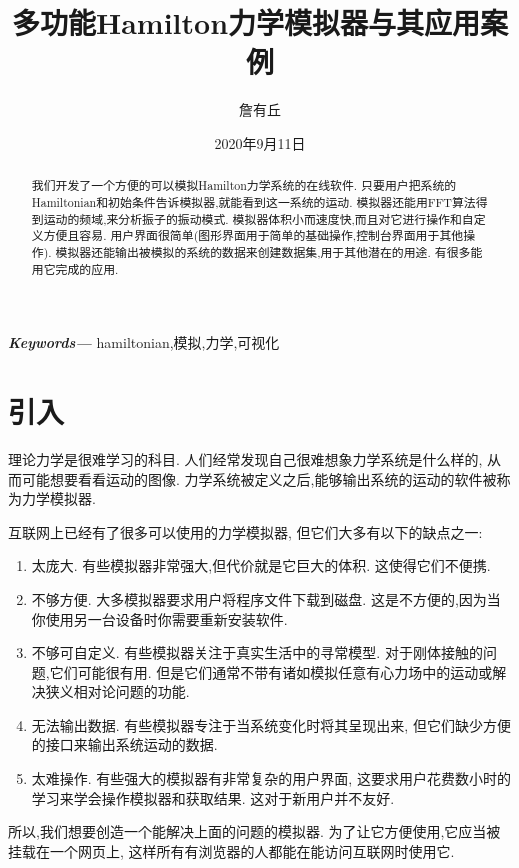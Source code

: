 \documentclass[12pt]{article}
\date{2020年9月11日}
\title{多功能Hamilton力学模拟器与其应用案例}
\author{詹有丘}
\providecommand{\keywords}[1]{\small\textbf{\textit{Keywords---}} #1}
\begin{document}
\maketitle

\begin{abstract}
我们开发了一个方便的可以模拟Hamilton力学系统的在线软件.
只要用户把系统的Hamiltonian和初始条件告诉模拟器,就能看到这一系统的运动.
模拟器还能用FFT算法得到运动的频域,来分析振子的振动模式.
模拟器体积小而速度快,而且对它进行操作和自定义方便且容易.
用户界面很简单(图形界面用于简单的基础操作,控制台界面用于其他操作).
模拟器还能输出被模拟的系统的数据来创建数据集,用于其他潜在的用途.
有很多能用它完成的应用.
\end{abstract}

\keywords{hamiltonian,模拟,力学,可视化}

\tableofcontents

\section{引入}
\label{sec:intro}

理论力学是很难学习的科目.
人们经常发现自己很难想象力学系统是什么样的,
从而可能想要看看运动的图像.
力学系统被定义之后,能够输出系统的运动的软件被称为力学模拟器.

互联网上已经有了很多可以使用的力学模拟器,
但它们大多有以下的缺点之一:
\begin{enumerate}
  \item 太庞大.
  有些模拟器非常强大,但代价就是它巨大的体积.
  这使得它们不便携.

  \item 不够方便.
  大多模拟器要求用户将程序文件下载到磁盘.
  这是不方便的,因为当你使用另一台设备时你需要重新安装软件.

  \item 不够可自定义.
  有些模拟器关注于真实生活中的寻常模型.
  对于刚体接触的问题,它们可能很有用.
  但是它们通常不带有诸如模拟任意有心力场中的运动或解决狭义相对论问题的功能.

  \item 无法输出数据.
  有些模拟器专注于当系统变化时将其呈现出来,
  但它们缺少方便的接口来输出系统运动的数据.

  \item 太难操作.
  有些强大的模拟器有非常复杂的用户界面,
  这要求用户花费数小时的学习来学会操作模拟器和获取结果.
  这对于新用户并不友好.
\end{enumerate}

所以,我们想要创造一个能解决上面的问题的模拟器.
为了让它方便使用,它应当被挂载在一个网页上,
这样所有有浏览器的人都能在能访问互联网时使用它.
\end{document}

